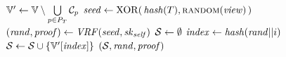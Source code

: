 \begin{algorithm}[hptb]
\caption{Sampling the Stochastic Set}\label{alg:sample}
\begin{algorithmic}[1]         

    \State $\mathit{\mathbb{V}'} \gets \mathbb{V}\setminus\bigcup\limits_{p\in P_T}\mathcal{C}_p$
    \State $\mathit{seed} \gets \mathrm{XOR}(\,\mathit{hash}(T), \mathrm{\textsc{random}}(\mathit{view})\,)$
    \State $(\mathit{rand}, \mathit{proof}) \gets \mathit{VRF}(\mathit{seed}, \mathit{sk}_{\mathit{self}})$ 
    \State $\mathcal{S} \gets \emptyset$
        \State $\mathit{index} \gets \mathit{hash}(\mathit{rand}||i)$ 
        \State $\mathcal{S} \gets \mathcal{S} \cup \{\mathit{\mathbb{V}'}[\mathit{index}]\}$
    \EndFor
    \State \Return $(\mathcal{S}, \mathit{rand}, \mathit{proof})$
\EndProcedure

\end{algorithmic}
\end{algorithm}
